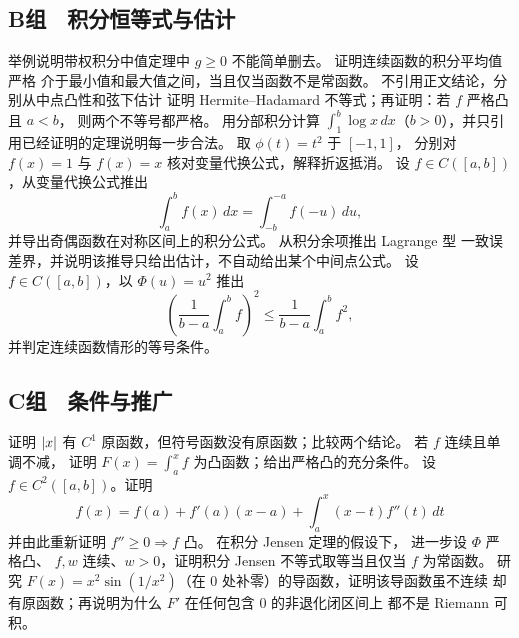 \subsection*{B组　积分恒等式与估计}
\begin{enumerate}[label=\textbf{\thechapter.\arabic*.},resume]
  举例说明带权积分中值定理中
 \(g\ge0\) 不能简单删去。
  证明连续函数的积分平均值严格
 介于最小值和最大值之间，当且仅当函数不是常函数。
  不引用正文结论，分别从中点凸性和弦下估计
 证明 Hermite--Hadamard 不等式；再证明：若 \(f\) 严格凸且 \(a<b\)，
 则两个不等号都严格。
  用分部积分计算
 \(\int_1^b\log x\,dx\)（\(b>0\)），并只引用已经证明的定理说明每一步合法。
  取 \(\phi(t)=t^2\) 于 \([-1,1]\)，
 分别对 \(f(x)=1\) 与 \(f(x)=x\) 核对变量代换公式，解释折返抵消。
  设 \(f\in C([a,b])\)，从变量代换公式推出
 \[
  \int_a^b f(x)\,dx=\int_{-b}^{-a}f(-u)\,du,
 \]
 并导出奇偶函数在对称区间上的积分公式。
  从积分余项推出 Lagrange 型
 一致误差界，并说明该推导只给出估计，不自动给出某个中间点公式。
  设 \(f\in C([a,b])\)，以 \(\Phi(u)=u^2\) 推出
 \[
 \left(\frac1{b-a}\int_a^b f\right)^2
 \le\frac1{b-a}\int_a^b f^2,
 \]
 并判定连续函数情形的等号条件。
\end{enumerate}

\subsection*{C组　条件与推广}
\begin{enumerate}[label=\textbf{\thechapter.\arabic*.},resume]
  证明 \(\left|x\right|\) 有
 \(C^1\) 原函数，但符号函数没有原函数；比较两个结论。
  若 \(f\) 连续且单调不减，
 证明 \(F(x)=\int_a^x f\) 为凸函数；给出严格凸的充分条件。
  设
 \(f\in C^2([a,b])\)。证明
 \[
 f(x)=f(a)+f'(a)(x-a)+\int_a^x(x-t)f''(t)\,dt
 \]
 并由此重新证明 \(f''\ge0\Rightarrow f\) 凸。
  在积分 Jensen 定理的假设下，
 进一步设 \(\Phi\) 严格凸、
 \(f,w\) 连续、\(w>0\)，证明积分 Jensen 不等式取等当且仅当
 \(f\) 为常函数。
  研究
 \(F(x)=x^2\sin(1/x^2)\)（在 \(0\) 处补零）的导函数，证明该导函数虽不连续
 却有原函数；再说明为什么 \(F'\) 在任何包含 \(0\) 的非退化闭区间上
 都不是 Riemann 可积。
\end{enumerate}
